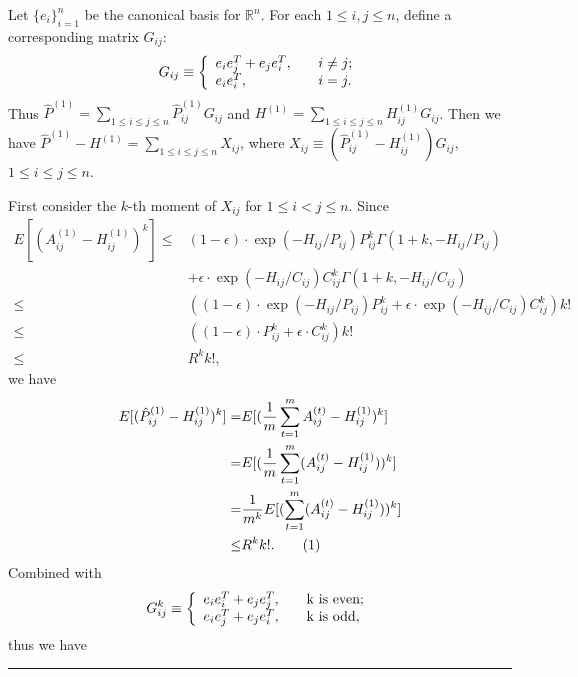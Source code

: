\documentclass[a4paper]{article}
\newenvironment{proof}{{\bf Proof:  }}{\hfill\rule{2mm}{2mm}}
\begin{document}
\noindent
\begin{proof}
Let $\{e_i\}_{i=1}^n$ be the canonical basis for $\mathbb{R}^n$. For each $1 \le i, j \le n$, define a corresponding matrix $G_{ij}$:
\[
    G_{ij} \equiv \left\{
    \begin{array}{l l}
        e_i e_j^T + e_j e_i^T, \quad & i \ne j;\\
        e_i e_i^T, \quad & i = j.
    \end{array}
    \right.
\]
Thus $\hat{P}^{(1)} = \sum_{1 \le i \le j \le n} \hat{P}^{(1)}_{ij} G_{ij}$ and $H^{(1)} = \sum_{1 \le i \le j \le n} H^{(1)}_{ij} G_{ij}$. Then we have $\hat{P}^{(1)} - H^{(1)} = \sum_{1 \le i \le j \le n} X_{ij}$, where $X_{ij} \equiv \left( \hat{P}^{(1)}_{ij} - H^{(1)}_{ij} \right) G_{ij}$, $1 \le i \le j \le n$.

First consider the $k$-th moment of $X_{ij}$ for $1 \le i < j \le n$. 
Since
\begin{align*}
	E[(A^{(1)}_{ij} - H^{(1)}_{ij})^k]
    \le & (1-\epsilon) \cdot \exp(-H_{ij}/P_{ij}) P_{ij}^k \Gamma(1+k, -H_{ij}/P_{ij}) \\
    & + \epsilon \cdot \exp(-H_{ij}/C_{ij}) C_{ij}^k \Gamma(1+k, -H_{ij}/C_{ij}) \\
    \le & \left( (1-\epsilon) \cdot \exp(-H_{ij}/P_{ij}) P_{ij}^k + \epsilon \cdot \exp(-H_{ij}/C_{ij}) C_{ij}^k \right) k! \\
    \le & \left( (1-\epsilon) \cdot P_{ij}^k + \epsilon \cdot C_{ij}^k \right) k! \\
    \le & R^k k!,
\end{align*}
we have
\begin{align*}
	E[(\hat{P}^{(1)}_{ij} - H^{(1)}_{ij})^k]
    = & E[(\frac{1}{m}\sum_{t=1}^m A^{(t)}_{ij} - H^{(1)}_{ij})^k] \\
    = & E[(\frac{1}{m}\sum_{t=1}^m (A^{(t)}_{ij} - H^{(1)}_{ij}))^k] \\
    = & \frac{1}{m^k} E[(\sum_{t=1}^m (A^{(t)}_{ij} - H^{(1)}_{ij}))^k] \\
    \le & R^k k!.
    \stepcounter{equation}\tag{\theequation}\label{eqn:expectpdiffqpowerkL1}
\end{align*}
Combined with
\[
    G_{ij}^k \equiv \left\{
    \begin{array}{l l}
        e_i e_i^T + e_j e_j^T, \quad & $k$ \text{ is even};\\
        e_i e_j^T + e_j e_i^T, \quad & $k$ \text{ is odd},
    \end{array}
    \right.
\]
thus we have

\end{proof}
\end{document}
